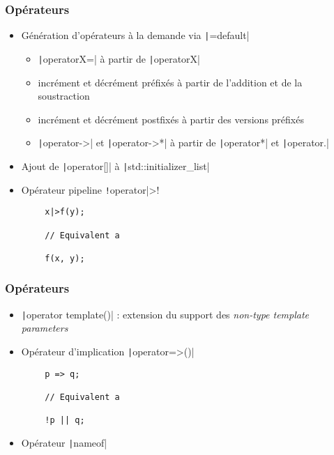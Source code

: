 \documentclass[C++.tex]{subfiles}
\begin{document}
\begin{frame}[fragile]
	\frametitle{Opérateurs}
	\begin{itemize}
		\item Génération d'opérateurs à la demande via \texttt|=default|
		\begin{itemize}
			\item \texttt|operatorX=| à partir de \texttt|operatorX|
			\item incrément et décrément préfixés à partir de l'addition et de la soustraction
			\item incrément et décrément postfixés à partir des versions préfixés
			\item \texttt|operator->| et \texttt|operator->*| à partir de \texttt|operator*| et \texttt|operator.|


		\end{itemize}
		\item Ajout de \texttt|operator[]| à \texttt|std::initializer_list|
		\item Opérateur pipeline \texttt!operator|>!
	\end{itemize}

	\begin{verbatim}
		x|>f(y);

		// Equivalent a

		f(x, y);
	\end{verbatim}
\end{frame}

\begin{frame}[fragile]
	\frametitle{Opérateurs}
	\begin{itemize}
		\item \texttt|operator template()| : extension du support des \textit{non-type template parameters}
		\item Opérateur d'implication \texttt|operator=>()|
	\end{itemize}

	\begin{verbatim}
		p => q;
	
		// Equivalent a

		!p || q;
	\end{verbatim}

	\begin{itemize}
		\item Opérateur \texttt|nameof|


	\end{itemize}
\end{frame}
\end{document}
